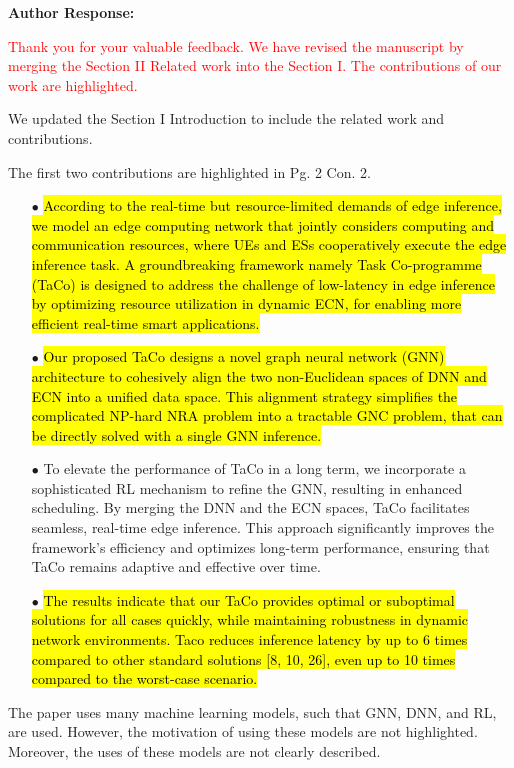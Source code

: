 \documentclass{ar2rc}
\newcommand{\highlight}[1]{\sethlcolor{yellow!50}\hl{#1}}
\begin{document}
\textbf{Author Response:}

\textcolor{red}{Thank you for your valuable feedback. We have revised the manuscript by merging the Section II Related work into the Section I. The contributions of our work are highlighted.}

We updated the Section I Introduction to include the related work and contributions. 

The first two contributions are highlighted in Pg. 2 Con. 2.
\begin{itemize}
	\item[$\bullet$] \highlight{According to the real-time but resource-limited demands of edge inference, we model an edge computing network that jointly considers computing and communication resources, where UEs and ESs cooperatively execute the edge inference task. A groundbreaking framework namely Task Co-programme (TaCo) is designed to address the challenge of low-latency in edge inference by optimizing resource utilization in dynamic ECN, for enabling more efficient real-time smart applications.}

	\item[$\bullet$] \highlight{Our proposed TaCo designs a novel graph neural network (GNN) architecture to cohesively align the two non-Euclidean spaces of DNN and ECN into a unified data space. This alignment strategy simplifies the complicated NP-hard NRA problem into a tractable GNC problem, that can be directly solved with a single GNN inference.}
   \item[$\bullet$] To elevate the performance of TaCo in a long term, we incorporate a sophisticated RL mechanism to refine the GNN, resulting in enhanced scheduling. By merging the DNN and the ECN spaces, TaCo facilitates seamless, real-time edge inference. This approach significantly improves the framework's efficiency and optimizes long-term performance, ensuring that TaCo remains adaptive and effective over time.
	\item[$\bullet$] \highlight{The results indicate that our TaCo provides optimal or suboptimal solutions for all cases quickly, while maintaining robustness in dynamic network environments. Taco reduces inference latency by up to 6 times compared to other standard solutions [8, 10, 26], even up to 10 times compared to the worst-case scenario.}
\end{itemize}

\begin{tcolorbox}[
   title={Reviewer 3: Comment 2},
   colback=gray!10,%
   colframe=black,%
   width=\linewidth,%
   arc=1mm, auto outer arc,
   boxrule=0.5pt,
]
The paper uses many machine learning models, such that GNN, DNN, and RL, are used. However, the motivation of using these models are not highlighted. Moreover, the uses of these models are not clearly described.
\end{tcolorbox}
\end{document}
